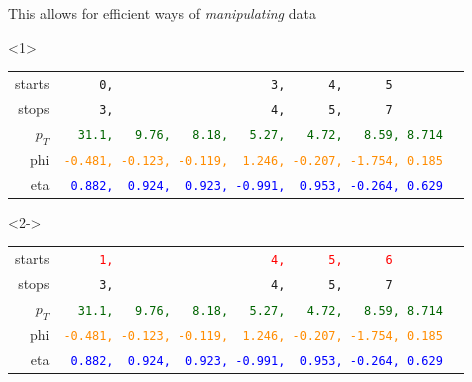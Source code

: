 \documentclass[aspectratio=169]{beamer}
\begin{document}
\begin{frame}[fragile]{This allows for efficient ways of {\it manipulating} data}
\vspace{0.25 cm}
\begin{onlyenv}<1>
\begin{tabular}{r l}
\small starts  &                    {\tt\scriptsize \ \ \ \ \ 0,\ \ \ \ \ \ \ \ \ \ \ \ \ \ \ \ \ \ \ \ \ \ 3,\ \ \ \ \ \ 4,\ \ \ \ \ \ 5\ \ \ \ \ \ \ \ \ } \\
\small stops   &                    {\tt\scriptsize \ \ \ \ \ 3,\ \ \ \ \ \ \ \ \ \ \ \ \ \ \ \ \ \ \ \ \ \ 4,\ \ \ \ \ \ 5,\ \ \ \ \ \ 7\ \ \ \ \ \ \ \ \ } \\
\small $p_T$ & \textcolor{darkgreen}{\tt\scriptsize \ \ 31.1,\ \ \ 9.76,\ \ \ 8.18,\ \ \ 5.27,\ \ \ 4.72,\ \ \ 8.59, 8.714} \\
\small phi &  \textcolor{darkorange}{\tt\scriptsize -0.481,\ -0.123,\ -0.119,\ \ 1.246,\ -0.207,\ -1.754,\ 0.185} \\
\small eta &        \textcolor{blue}{\tt\scriptsize \ 0.882,\ \ 0.924,\ \ 0.923,\ -0.991,\ \ 0.953,\ -0.264,\ 0.629} \\
\end{tabular}
\end{onlyenv}\begin{onlyenv}<2->
\begin{tabular}{r l}
\small starts  &     \textcolor{red}{\tt\scriptsize \ \ \ \ \ 1,\ \ \ \ \ \ \ \ \ \ \ \ \ \ \ \ \ \ \ \ \ \ 4,\ \ \ \ \ \ 5,\ \ \ \ \ \ 6\ \ \ \ \ \ \ \ \ } \\
\small stops   &                    {\tt\scriptsize \ \ \ \ \ 3,\ \ \ \ \ \ \ \ \ \ \ \ \ \ \ \ \ \ \ \ \ \ 4,\ \ \ \ \ \ 5,\ \ \ \ \ \ 7\ \ \ \ \ \ \ \ \ } \\
\small $p_T$ & \textcolor{darkgreen}{\tt\scriptsize \ \ 31.1,\ \ \ 9.76,\ \ \ 8.18,\ \ \ 5.27,\ \ \ 4.72,\ \ \ 8.59, 8.714} \\
\small phi &  \textcolor{darkorange}{\tt\scriptsize -0.481,\ -0.123,\ -0.119,\ \ 1.246,\ -0.207,\ -1.754,\ 0.185} \\
\small eta &        \textcolor{blue}{\tt\scriptsize \ 0.882,\ \ 0.924,\ \ 0.923,\ -0.991,\ \ 0.953,\ -0.264,\ 0.629} \\
\end{tabular}\end{onlyenv}

\vspace{0.5 cm}
\end{frame}





\begin{frame}{}
\end{frame}
\end{document}
